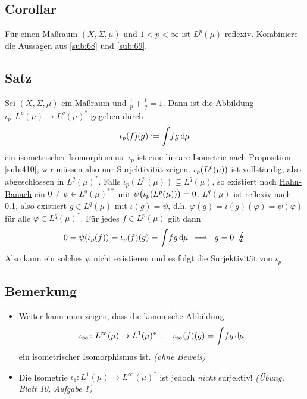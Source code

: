 \subsection[Corollar: $L^p(\mu)$ ist für $1<p<\infty$ reflexiv.]{Corollar} %
\label{sub:610}
Für einen Maßraum $(X,\Sigma, \mu)$ und $1 < p< \infty$ ist $L^p(\mu)$ reflexiv.
Kombiniere die Aussagen aus \ref{sub:68} und \ref{sub:69}. \bewende

\subsection[Satz: Isometrischer Isomorphismus $\iota_p \colon L^p(\mu) \to L^q(\mu)^*$]{Satz} %
\label{sub:611}
Sei $(X,\Sigma,\mu)$ ein Maßraum und $\frac{1}{p} + \frac{1}{q}=1$. Dann ist die Abbildung $\iota_p \colon L^p(\mu) \to L^q(\mu)^*$ gegeben durch 
\[
	\iota_p(f)(g) := \int \!f g \,\mathd\mu
\] 
ein isometrischer Isomorphismus.
$\iota_p$ ist eine lineare Isometrie nach Proposition \ref{sub:410}, wir müssen also nur Surjektivität zeigen. $\iota_p \enbrace*{L^p(\mu)}$ ist vollständig, also 
abgeschlossen in $L^q(\mu)^*$. Falls $\iota_p(L^p(\mu)) \subsetneq L^q(\mu)$, so existiert nach \hyperref[sub:227]{Hahn-Banach} ein $0 \not= \psi \in L^q(\mu)^{**}$ mit
$\psi \enbrace[\big]{\iota_p(L^p(\mu))} =0$. $L^q(\mu)$ ist reflexiv nach \ref{sub:610}, also existiert $g \in L^q(\mu)$ mit $\iota(g)=\psi$, d.h. 
$\varphi(g)= \iota(g)(\varphi)=\psi(\varphi)$ für alle $\varphi \in L^q(\mu)^*$. Für jedes $f\in L^p(\mu)$ gilt dann
\[
	0 = \psi \enbrace*{\iota_p(f)} = \iota_p(f)(g) = \int\! f g \, \mathd\mu \enspace \Longrightarrow \enspace g=0 \enspace\light
\]
Also kann ein solches $\psi$ nicht existieren und es folgt die Surjektivität von $\iota_p$. \bewende

\subsection[Bemerkung zur Gültigkeit von Satz \ref{sub:611} für $p\in \set{1,\infty}$]{Bemerkung} %
\label{sub:612}
\begin{itemize}
	\item Weiter kann man zeigen, dass die kanonische Abbildung 
	\[
		\iota_\infty \colon L^\infty(\mu) \to L^1(\mu)^* \enspace,  \quad \iota_\infty(f)(g) = \int\! fg \, \mathd\mu
	\]
	ein isometrischer Isomorphismus ist. \hfill \emph{(ohne Beweis)}
	\item Die Isometrie $\iota_1 \colon L^1(\mu) \to L^\infty(\mu)^*$ ist jedoch \emph{nicht} surjektiv! \hfill \emph{(Übung, Blatt 10, Aufgabe 1)}
\end{itemize}

